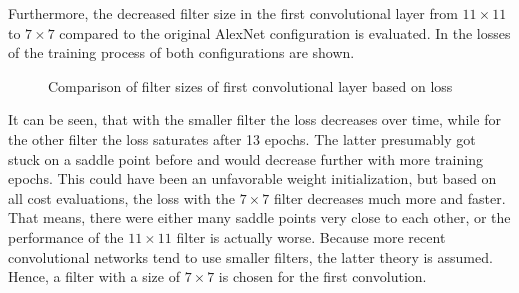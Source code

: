 Furthermore, the decreased filter size in the first convolutional layer from $11 \times 11$ to $7 \times 7$ compared to the original AlexNet configuration is evaluated.
In  the losses of the training process of both configurations are shown.
\begin{figure}
	\setlength{}
	\setlength{}
	\centering
	
	\caption{Comparison of filter sizes of first convolutional layer based on loss}
	\label{fig:first-conv-filter}
\end{figure}
It can be seen, that with the smaller filter the loss decreases over time, while for the other filter the loss saturates after 13 epochs.
The latter presumably got stuck on a saddle point before and would decrease further with more training epochs.
This could have been an unfavorable weight initialization, but based on all cost evaluations, the loss with the $7 \times 7$ filter decreases much more and faster.
That means, there were either many saddle points very close to each other, or the performance of the $11 \times 11$ filter is actually worse.
Because more recent convolutional networks tend to use smaller filters, the latter theory is assumed.
Hence, a filter with a size of $7 \times 7$ is chosen for the first convolution.

